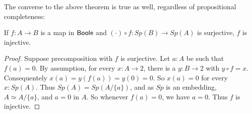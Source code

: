 The converse to the above theorem is true as well, regardless of propositional completeness:
\begin{lemma}
If $f:A\to B$ is a map in $\mathsf{Boole}$ and $(\cdot) \circ f :Sp(B) \to Sp(A)$ is surjective, 
$f$ is injective. 
\end{lemma}
\begin{proof}
  Suppose precomposition with $f$ is surjective. 
  Let $a:A$ be such that $f(a)= 0$. 
  By assumption, for every $x:A\to 2$, there is a $y:B\to 2$ with $y\circ f = x$. 
  Consequentely $x(a) = y(f(a)) = y(0) = 0$. 
  So $x(a) = 0$ for every $x:Sp(A)$. 
  Thus $Sp(A) = Sp(A/\{a\})$, and as $Sp$ is an embedding, 
  $A \simeq A/\{a\}$, and $a = 0$ in $A$. 
  So whenever $f(a) = 0$, we have $a=0$. Thus $f$ is injective. 
\end{proof}

